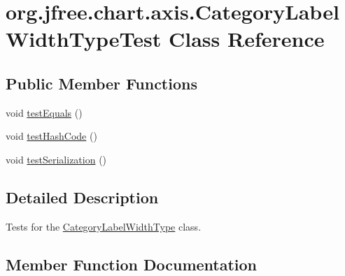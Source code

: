 \hypertarget{classorg_1_1jfree_1_1chart_1_1axis_1_1_category_label_width_type_test}{}\section{org.\+jfree.\+chart.\+axis.\+Category\+Label\+Width\+Type\+Test Class Reference}
\label{classorg_1_1jfree_1_1chart_1_1axis_1_1_category_label_width_type_test}
\subsection*{Public Member Functions}
\begin{DoxyCompactItemize}
\item 
void \mbox{\hyperlink{classorg_1_1jfree_1_1chart_1_1axis_1_1_category_label_width_type_test_a666409efa24e919f4a93bc8a0aa02410}{test\+Equals}} ()
\item 
void \mbox{\hyperlink{classorg_1_1jfree_1_1chart_1_1axis_1_1_category_label_width_type_test_ac91168b86630cfeb8835e097d7f3e4e1}{test\+Hash\+Code}} ()
\item 
void \mbox{\hyperlink{classorg_1_1jfree_1_1chart_1_1axis_1_1_category_label_width_type_test_a999047bd82b2692a3b9cee413eeb903e}{test\+Serialization}} ()
\end{DoxyCompactItemize}


\subsection{Detailed Description}
Tests for the \mbox{\hyperlink{classorg_1_1jfree_1_1chart_1_1axis_1_1_category_label_width_type}{Category\+Label\+Width\+Type}} class. 

\subsection{Member Function Documentation}
\mbox{\label{classorg_1_1jfree_1_1chart_1_1axis_1_1_category_label_width_type_test_a666409efa24e919f4a93bc8a0aa02410}} 
